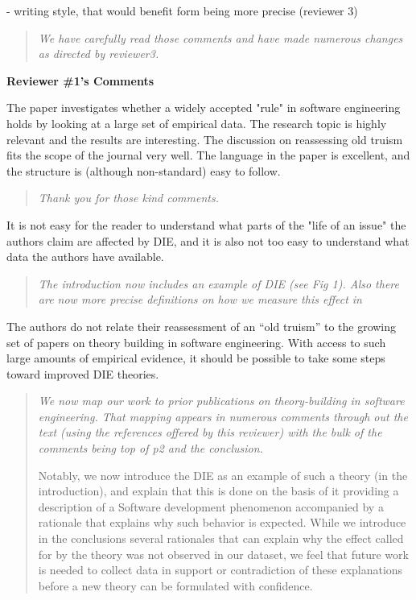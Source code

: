  
- writing style, that would benefit form being more
precise (reviewer 3)

\begin{quote}{\em We have carefully read those comments and have made numerous changes
as directed by reviewer3.}\end{quote}

{\bf Reviewer \#1's Comments}


The paper investigates whether a widely
accepted "rule" in software engineering holds by looking at
a large set of empirical data. The research topic is highly
relevant and the results are interesting.   The discussion
on reassessing old truism fits the scope of the journal very
well.  The language in the paper is excellent, and the
structure is (although non-standard) easy to follow.

\begin{quote}{\em Thank you for those kind comments.}\end{quote}

It is not easy for the reader to understand what parts
of the "life of an issue" the authors claim are affected by
DIE, and it is also not too easy to understand what data the
authors have available.  

\begin{quote}{\em  The introduction now includes an example of DIE  (see Fig 1).
Also there are now more precise  definitions on how we measure this effect in }\end{quote}
 
 The authors do not relate their reassessment of an
``old truism'' to the growing set of papers on theory building
in software engineering. With access to such large amounts
of empirical evidence, it should be possible to take some
steps toward improved DIE theories. 

\begin{quote}{\em We now map our work to prior publications on theory-building in software engineering. That mapping appears in numerous comments through out the text (using the references offered by this reviewer) with the bulk of the comments being top of p2 and the conclusion. 

Notably, we now introduce the DIE as an example of such a theory (in the introduction), and explain that this is done on the basis of it providing a description of a Software development phenomenon accompanied by a rationale that explains why such behavior is expected. While we introduce in the conclusions several rationales that can explain why the effect called for by the theory was not observed in our dataset, we feel that future work is needed to collect data in support or contradiction of these explanations before a new theory can be formulated with confidence. }\end{quote}

